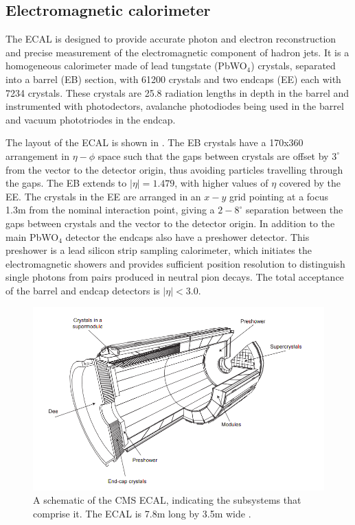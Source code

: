 \subsection{Electromagnetic calorimeter}
\label{sec:ECAL}
The \ac{ECAL} is designed to provide accurate photon and electron reconstruction and precise measurement of the electromagnetic component of hadron jets. It is a homogeneous calorimeter made of lead tungstate (PbWO$_{4}$) crystals, separated into a barrel (\ac{EB}) section, with 61200 crystals and two endcaps (\ac{EE}) each with 7234 crystals. These crystals are 25.8 radiation lengths in depth in the barrel and instrumented with photodectors, avalanche photodiodes being used in the barrel and vacuum phototriodes in the endcap. 

The layout of the \ac{ECAL} is shown in . The \ac{EB} crystals have a 170x360 arrangement in $\eta-\phi$ space such that the gaps between crystals are offset by $3^{\circ}$ from the vector to the detector origin, thus avoiding particles travelling through the gaps. The \ac{EB} extends to $|\eta|=1.479$, with higher values of $\eta$ covered by the \ac{EE}. The crystals in the \ac{EE} are arranged in an $x-y$ grid pointing at a focus 1.3m from the nominal interaction point, giving a $2-8^{\circ}$ separation between the gaps between crystals and the vector to the detector origin. In addition to the main PbWO$_{4}$ detector the endcaps also have a preshower detector. This preshower is a lead silicon strip sampling calorimeter, which initiates the electromagnetic showers and provides sufficient position resolution to distinguish single photons from pairs produced in neutral pion decays. The total acceptance of the barrel and endcap detectors is $|\eta|<3.0$.

\begin{figure}
  \includegraphics[width=1.2\largefigwidth]{plots/detector/ecal_layout.png}
  \caption{A schematic of the CMS \ac{ECAL}, indicating the subsystems that comprise it. The \ac{ECAL} is 7.8m long by 3.5m wide \cite{Chatrchyan:2008aa}.}
  \label{fig:ecalschematic}
\end{figure}

